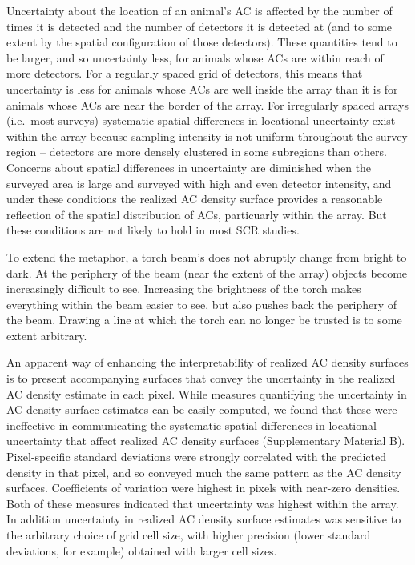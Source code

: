 \documentclass[useAMS,usenatbib,referee]{biom}
\begin{document}
Uncertainty about the location of an animal's AC is affected by the number of times it is detected and the number of detectors it is detected at (and to some extent by the spatial configuration of those detectors). These quantities tend to be larger, and so uncertainty less, for animals whose ACs are within reach of more detectors. For a regularly spaced grid of detectors, this means that uncertainty is less for animals whose ACs are well inside the array than it is for animals whose ACs are near the border of the array. For irregularly spaced arrays (i.e.\ most surveys) systematic spatial differences in locational uncertainty exist within the array because sampling intensity is not uniform throughout the survey region -- detectors are more densely clustered in some subregions than others. Concerns about spatial differences in uncertainty are diminished when the surveyed area is large and surveyed with high and even detector intensity, and under these conditions the realized AC density surface provides a reasonable reflection of the spatial distribution of ACs, particuarly within the array. But these conditions are not likely to hold in most SCR studies.

To extend the metaphor, a torch beam's does not abruptly change from bright to dark. At the periphery of the beam (near the extent of the array) objects become increasingly difficult to see. Increasing the brightness of the torch makes everything within the beam easier to see, but also pushes back the periphery of the beam. Drawing a line at which the torch can no longer be trusted is to some extent arbitrary. 

An apparent way of enhancing the interpretability of realized AC density surfaces is to present accompanying surfaces that convey the uncertainty in the realized AC density estimate in each pixel. While measures quantifying the uncertainty in AC density surface estimates can be easily computed, we found that these were ineffective in communicating the systematic spatial differences in locational uncertainty that affect realized AC density surfaces (Supplementary Material B). Pixel-specific standard deviations were strongly correlated with the predicted density in that pixel, and so conveyed much the same pattern as the AC density surfaces. Coefficients of variation were highest in pixels with near-zero densities. Both of these measures indicated that uncertainty was highest within the array. In addition uncertainty in realized AC density surface estimates was sensitive to the arbitrary choice of grid cell size, with higher precision (lower standard deviations, for example) obtained with larger cell sizes. 
\end{document}
